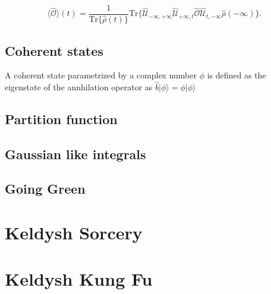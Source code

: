\documentclass[a4paper, 12pt]{article}
\begin{document}
\begin{equation}
\langle \hat{\mathcal{O}} \rangle (t)  = \frac{1}{\mathrm{Tr}\{\hat{\rho}(t)\}} \mathrm{Tr}\{\hat{\mathcal{U}}_{-\infty,+\infty} \hat{\mathcal{U}}_{+\infty,t} \hat{\mathcal{O}} \hat{\mathcal{U}}_{t,-\infty} \hat{\rho}(-\infty)  \}.
\end{equation}

\subsection {Coherent states}
A coherent state parametrized by a complex number $\phi$ is defined as the eigenstate of the annhilation operator  as $\hat{b} |\phi\rangle = \phi |\phi\rangle$
\subsection {Partition function}

\subsection {Gaussian like integrals}

\subsection {Going Green}


\section {Keldysh Sorcery}

\section {Keldysh Kung Fu}
\end{document}
